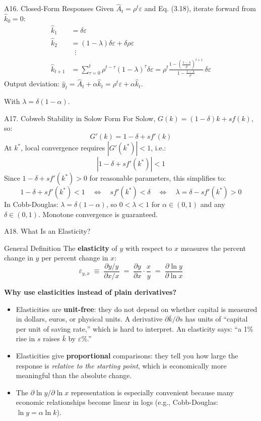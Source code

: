 \documentclass[aspectratio=169,10pt]{beamer}
\newcommand{\backbutton}[1]{\hfill\hyperlink{#1}{\beamerbutton{Back}}}
\begin{document}
\begin{frame}{A16. Closed-Form Responses}
\hypertarget{a16}{}
Given $\hat{A}_t=\rho^t\varepsilon$ and Eq. (3.18), iterate forward from $\hat{k}_0=0$:
\begin{align*}
\hat{k}_1 &= \delta\varepsilon \\
\hat{k}_2 &= (1-\lambda)\delta\varepsilon + \delta\rho\varepsilon \\
&\;\;\vdots \\
\hat{k}_{t+1} &= \sum_{\tau=0}^{t}\rho^{t-\tau}(1-\lambda)^{\tau}\delta\varepsilon
= \rho^t \frac{1-\left(\frac{1-\lambda}{\rho}\right)^{t+1}}{1-\frac{1-\lambda}{\rho}}\,\delta\varepsilon
\end{align*}
Output deviation: $\hat{y}_t=\hat{A}_t+\alpha\hat{k}_t = \rho^t\varepsilon + \alpha\hat{k}_t$.

With $\lambda=\delta(1-\alpha)$.
\backbutton{m-a16}
\end{frame}

\begin{frame}{A17. Cobweb Stability in Solow Form}
\hypertarget{a17}{}
For Solow, $G(k) = (1-\delta)k + sf(k)$, so:
\[
G'(k)=1-\delta+s f'(k)
\]
At $k^*$, local convergence requires $|G'(k^*)|<1$, i.e.:
\[
|1-\delta+s f'(k^*)|<1
\]
Since $1-\delta+sf'(k^*)>0$ for reasonable parameters, this simplifies to:
\[
1-\delta+s f'(k^*)<1 \quad\Leftrightarrow\quad sf'(k^*)<\delta \quad\Leftrightarrow\quad \lambda = \delta-sf'(k^*)>0
\]
In Cobb-Douglas: $\lambda=\delta(1-\alpha)$, so $0<\lambda<1$ for $\alpha\in(0,1)$ and any $\delta\in(0,1)$. Monotone convergence is guaranteed.
\backbutton{m-a17}
\end{frame}

\begin{frame}{A18. What Is an Elasticity?}
\hypertarget{a18}{}
\begin{block}{General Definition}
The \textbf{elasticity} of $y$ with respect to $x$ measures the percent change in $y$ per percent change in $x$:
\[
\varepsilon_{y,x} \;\equiv\; \frac{\partial y / y}{\partial x / x} \;=\; \frac{\partial y}{\partial x}\cdot\frac{x}{y} \;=\; \frac{\partial \ln y}{\partial \ln x}
\]
\end{block}
\textbf{Why use elasticities instead of plain derivatives?}
\begin{itemize}
  \item Elasticities are \textbf{unit-free}: they do not depend on whether capital is measured in dollars, euros, or physical units. A derivative $\partial \bar{k}/\partial s$ has units of ``capital per unit of saving rate,'' which is hard to interpret. An elasticity says: ``a 1\% rise in $s$ raises $\bar{k}$ by $\varepsilon\%$.''
  \item Elasticities give \textbf{proportional} comparisons: they tell you how large the response is \emph{relative to the starting point}, which is economically more meaningful than the absolute change.
  \item The $\partial\ln y / \partial\ln x$ representation is especially convenient because many economic relationships become linear in logs (e.g., Cobb-Douglas: $\ln y = \alpha \ln k$).
\end{itemize}
\end{frame}
\end{document}

